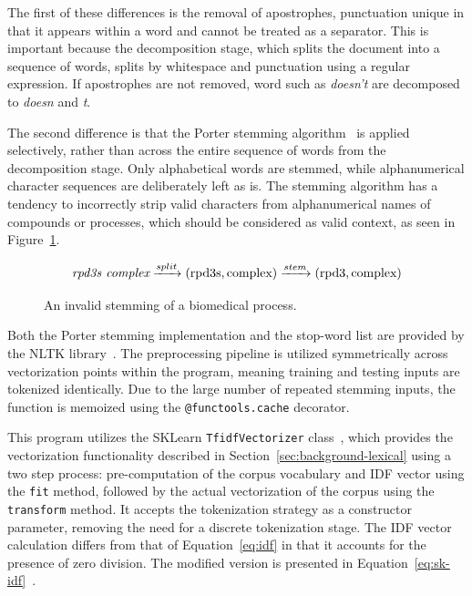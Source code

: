 \documentclass[11pt]{article}
\theoremstyle{plain}
\theoremstyle{definition}
\begin{document}
The first of these differences is the removal of apostrophes, punctuation unique in that it appears within a word and cannot be treated as a separator. This is important because the decomposition stage, which splits the document into a sequence of words, splits by whitespace and punctuation using a regular expression. If apostrophes are not removed, word such as \textit{doesn't} are decomposed to \textit{doesn} and \textit{t}.

The second difference is that the Porter stemming algorithm~\cite{porter/1980/algorithm}  is applied selectively, rather than across the entire sequence of words from the decomposition stage. Only alphabetical words are stemmed, while alphanumerical character sequences are deliberately left as is. The stemming algorithm has a tendency to incorrectly strip valid characters from alphanumerical names of compounds or processes, which should be considered as valid context, as seen in Figure~\ref{fig:invalid-stem}.

\begin{figure}
    \centering
    \[\textit{rpd3s complex} \xrightarrow {split} (\textnormal{rpd3s}, \textnormal{complex}) \xrightarrow {stem}  (\textnormal{rpd3}, \textnormal{complex})\]
    \caption{An invalid stemming of a biomedical process.}\label{fig:invalid-stem}
\end{figure}

Both the Porter stemming implementation and the stop-word list are provided by the NLTK library~\cite{loper/2009/natural}. The preprocessing pipeline is utilized symmetrically across vectorization points within the program, meaning training and testing inputs are tokenized identically. Due to the large number of repeated stemming inputs, the function is memoized using the \verb|@functools.cache| decorator.

This program utilizes the SKLearn \verb|TfidfVectorizer| class~\cite{sklearn/2026/tfidfvectorizer}, which provides the vectorization functionality described in Section~\ref{sec:background-lexical} using a two step process: pre-computation of the corpus vocabulary and IDF vector using the \verb|fit| method, followed by the actual vectorization of the corpus using the \verb|transform| method. It accepts the tokenization strategy as a constructor parameter, removing the need for a discrete tokenization stage. The IDF vector calculation differs from that of Equation~\ref{eq:idf} in that it accounts for the presence of zero division. The modified version is presented in Equation~\ref{eq:sk-idf}~\cite{sklearn/2026/tfidfvectorizer}.
\end{document}
